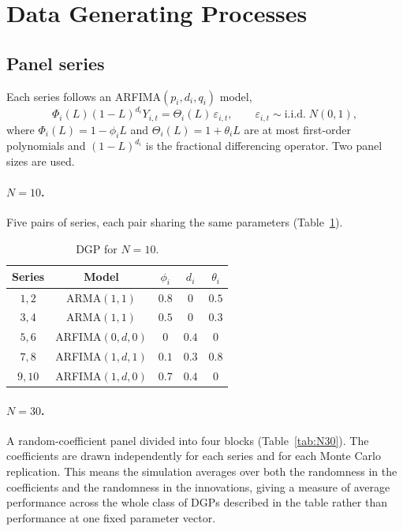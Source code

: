 \documentclass[12pt]{article}
\begin{document}
\section{Data Generating Processes}
\label{sec:dgp}

\subsection{Panel series}

Each series follows an ARFIMA$(p_i,d_i,q_i)$ model,
\[
\Phi_i(L)(1-L)^{d_i}Y_{i,t} = \Theta_i(L)\,\varepsilon_{i,t},
\qquad \varepsilon_{i,t} \sim \text{i.i.d.}\; N(0,1),
\]
where $\Phi_i(L)=1-\phi_i L$ and $\Theta_i(L)=1+\theta_i L$ are at most
first-order polynomials and $(1-L)^{d_i}$ is the fractional differencing
operator. Two panel sizes are used.

\paragraph{$N=10$.} Five pairs of series, each pair sharing the same
parameters (Table~\ref{tab:N10}).

\begin{table}[h]
\centering
\caption{DGP for $N=10$.}
\label{tab:N10}
\begin{tabular}{ccccc}
\toprule
Series & Model & $\phi_i$ & $d_i$ & $\theta_i$ \\
\midrule
$1,2$  & ARMA$(1,1)$     & $0.8$ & $0$   & $0.5$ \\
$3,4$  & ARMA$(1,1)$     & $0.5$ & $0$   & $0.3$ \\
$5,6$  & ARFIMA$(0,d,0)$ & $0$   & $0.4$ & $0$   \\
$7,8$  & ARFIMA$(1,d,1)$ & $0.1$ & $0.3$ & $0.8$ \\
$9,10$ & ARFIMA$(1,d,0)$ & $0.7$ & $0.4$ & $0$   \\
\bottomrule
\end{tabular}
\end{table}

\paragraph{$N=30$.} A random-coefficient panel divided into four blocks
(Table~\ref{tab:N30}). The coefficients are drawn independently for each
series and for each Monte Carlo replication. This means the simulation
averages over both the randomness in the coefficients and the randomness in
the innovations, giving a measure of average performance across the whole
class of DGPs described in the table rather than performance at one fixed
parameter vector.
\end{document}

